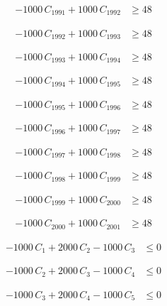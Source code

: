 \documentclass[a4paper,11pt]{article}
\begin{document}
\begin{align}
-1000\,C_{1991} + 1000\,C_{1992} &\geq 48 \nonumber
\end{align}

\begin{align}
-1000\,C_{1992} + 1000\,C_{1993} &\geq 48 \nonumber
\end{align}

\begin{align}
-1000\,C_{1993} + 1000\,C_{1994} &\geq 48 \nonumber
\end{align}

\begin{align}
-1000\,C_{1994} + 1000\,C_{1995} &\geq 48 \nonumber
\end{align}

\begin{align}
-1000\,C_{1995} + 1000\,C_{1996} &\geq 48 \nonumber
\end{align}

\begin{align}
-1000\,C_{1996} + 1000\,C_{1997} &\geq 48 \nonumber
\end{align}

\begin{align}
-1000\,C_{1997} + 1000\,C_{1998} &\geq 48 \nonumber
\end{align}

\begin{align}
-1000\,C_{1998} + 1000\,C_{1999} &\geq 48 \nonumber
\end{align}

\begin{align}
-1000\,C_{1999} + 1000\,C_{2000} &\geq 48 \nonumber
\end{align}

\begin{align}
-1000\,C_{2000} + 1000\,C_{2001} &\geq 48 \nonumber
\end{align}

\begin{align}
-1000\,C_{1} + 2000\,C_{2} - 1000\,C_{3} &\leq 0 \nonumber
\end{align}

\begin{align}
-1000\,C_{2} + 2000\,C_{3} - 1000\,C_{4} &\leq 0 \nonumber
\end{align}

\begin{align}
-1000\,C_{3} + 2000\,C_{4} - 1000\,C_{5} &\leq 0 \nonumber
\end{align}
\end{document}
